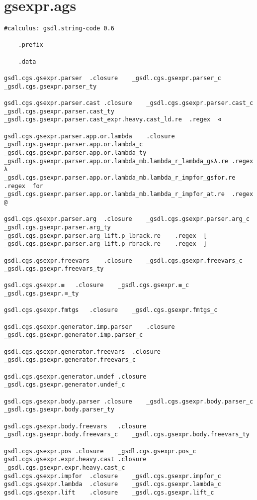 \documentclass{report}
\begin{document}
\section{gsexpr.ags}

\begin{verbatim}
#calculus: gsdl.string-code 0.6

	.prefix

	.data

gsdl.cgs.gsexpr.parser	.closure	_gsdl.cgs.gsexpr.parser_c	_gsdl.cgs.gsexpr.parser_ty

gsdl.cgs.gsexpr.parser.cast	.closure	_gsdl.cgs.gsexpr.parser.cast_c	_gsdl.cgs.gsexpr.parser.cast_ty
_gsdl.cgs.gsexpr.parser.cast_expr.heavy.cast_ld.re	.regex	⊲

gsdl.cgs.gsexpr.parser.app.or.lambda	.closure	_gsdl.cgs.gsexpr.parser.app.or.lambda_c	_gsdl.cgs.gsexpr.parser.app.or.lambda_ty
_gsdl.cgs.gsexpr.parser.app.or.lambda_mb.lambda_r_lambda_gsλ.re	.regex	λ
_gsdl.cgs.gsexpr.parser.app.or.lambda_mb.lambda_r_impfor_gsfor.re	.regex	for
_gsdl.cgs.gsexpr.parser.app.or.lambda_mb.lambda_r_impfor_at.re	.regex	@

gsdl.cgs.gsexpr.parser.arg	.closure	_gsdl.cgs.gsexpr.parser.arg_c	_gsdl.cgs.gsexpr.parser.arg_ty
_gsdl.cgs.gsexpr.parser.arg_lift.p_lbrack.re	.regex	⌊
_gsdl.cgs.gsexpr.parser.arg_lift.p_rbrack.re	.regex	⌋

gsdl.cgs.gsexpr.freevars	.closure	_gsdl.cgs.gsexpr.freevars_c	_gsdl.cgs.gsexpr.freevars_ty

gsdl.cgs.gsexpr.≡	.closure	_gsdl.cgs.gsexpr.≡_c	_gsdl.cgs.gsexpr.≡_ty

gsdl.cgs.gsexpr.fmtgs	.closure	_gsdl.cgs.gsexpr.fmtgs_c

gsdl.cgs.gsexpr.generator.imp.parser	.closure	_gsdl.cgs.gsexpr.generator.imp.parser_c

gsdl.cgs.gsexpr.generator.freevars	.closure	_gsdl.cgs.gsexpr.generator.freevars_c

gsdl.cgs.gsexpr.generator.undef	.closure	_gsdl.cgs.gsexpr.generator.undef_c

gsdl.cgs.gsexpr.body.parser	.closure	_gsdl.cgs.gsexpr.body.parser_c	_gsdl.cgs.gsexpr.body.parser_ty

gsdl.cgs.gsexpr.body.freevars	.closure	_gsdl.cgs.gsexpr.body.freevars_c	_gsdl.cgs.gsexpr.body.freevars_ty

gsdl.cgs.gsexpr.pos	.closure	_gsdl.cgs.gsexpr.pos_c
gsdl.cgs.gsexpr.expr.heavy.cast	.closure	_gsdl.cgs.gsexpr.expr.heavy.cast_c
gsdl.cgs.gsexpr.impfor	.closure	_gsdl.cgs.gsexpr.impfor_c
gsdl.cgs.gsexpr.lambda	.closure	_gsdl.cgs.gsexpr.lambda_c
gsdl.cgs.gsexpr.lift	.closure	_gsdl.cgs.gsexpr.lift_c


\end{verbatim}
\end{document}
